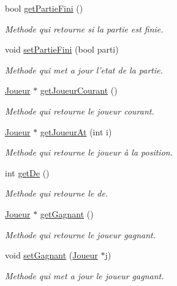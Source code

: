 \begin{DoxyCompactItemize}
\item 
bool \hyperlink{classDonneesJeu_a7d47cf2b384712fd2aca3494fc5e23b8}{get\-Partie\-Fini} ()
\begin{DoxyCompactList}\small\item\em \-Methode qui retourne si la partie est finie. \end{DoxyCompactList}\item 
void \hyperlink{classDonneesJeu_a97ab9601b004cb1ffd4365db0f90e479}{set\-Partie\-Fini} (bool parti)
\begin{DoxyCompactList}\small\item\em \-Methode qui met a jour l'etat de la partie. \end{DoxyCompactList}\item 
\hyperlink{classJoueur}{\-Joueur} $\ast$ \hyperlink{classDonneesJeu_a5c71130d171fbd79f39f90d1ab96d82c}{get\-Joueur\-Courant} ()
\begin{DoxyCompactList}\small\item\em \-Methode qui retourne le joueur courant. \end{DoxyCompactList}\item 
\hyperlink{classJoueur}{\-Joueur} $\ast$ \hyperlink{classDonneesJeu_a94ac64e9b0a6ec3e10a2589bb90830e4}{get\-Joueur\-At} (int i)
\begin{DoxyCompactList}\small\item\em \-Methode qui retourne le joueur à la position. \end{DoxyCompactList}\item 
int \hyperlink{classDonneesJeu_a9d66541ae27e731bcd4fca1a82b8c94f}{get\-De} ()
\begin{DoxyCompactList}\small\item\em \-Methode qui retourne le de. \end{DoxyCompactList}\item 
\hyperlink{classJoueur}{\-Joueur} $\ast$ \hyperlink{classDonneesJeu_a1f9959f0eae2138deb88422671c6a1f2}{get\-Gagnant} ()
\begin{DoxyCompactList}\small\item\em \-Methode qui retourne le joueur gagnant. \end{DoxyCompactList}\item 
void \hyperlink{classDonneesJeu_a2b7a86ddb0732fe79afa5f4ad71af9d2}{set\-Gagnant} (\hyperlink{classJoueur}{\-Joueur} $\ast$j)
\begin{DoxyCompactList}\small\item\em \-Methode qui met a jour le joueur gagnant. \end{DoxyCompactList}\item 

\end{DoxyCompactItemize}
